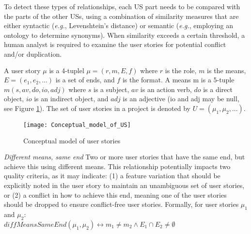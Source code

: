 To detect these types of relationships, each US part needs to be compared with the parts of the other USs, using a combination of similarity measures that are either syntactic (\emph{e.g.}, Levenshtein’s distance) or semantic (\emph{e.g.}, employing an ontology to determine synonyms). When similarity exceeds a certain threshold, a human analyst is required to examine the user stories for potential conﬂict and/or duplication.
\begin{definition}
A user story $\mu$ is a 4-tuplel $\mu=(r,m,E,f)$ where $r$ is the role, $m$ is the means, $E=(e_1, e_2, . . .)$ is a set of ends, and $f$ is the format. A means m is a 5-tuple $m (s,av,do,io,adj)$ where $s$ is a subject, $av$ is an action verb, $do$ is a direct object, $io$ is an indirect object, and $adj$ is an adjective (io and adj may be null, see Figure \ref{fig:conceptual_model}). The set of user stories in a project is denoted by $U=(\mu_1, \mu_2, . . .)$.
\end{definition}
\begin{figure}
\center
\texttt{[image: Conceptual\_model\_of\_US]}
\caption{Conceptual model of user stories \cite{lucassen2016improving}}\label{fig:conceptual_model}
\end{figure}
\begin{definition}
\emph{Different means, same end }Two or more user stories that have the same end, but achieve this using different means. This relationship potentially impacts two quality criteria, as it may indicate: (1) a feature variation that should be explicitly noted in the user story to maintain an unambiguous set of user stories, or (2) a conﬂict in how to achieve this end, meaning one of the user stories should be dropped to ensure conﬂict-free user stories. Formally, for user stories $\mu_1$ and $\mu_2$:\\ 
$diffMeansSameEnd(\mu_1,\mu_2)\leftrightarrow m_1 \neq m_2 \wedge E_1 \cap E_2 \neq \emptyset$
\end{definition}
